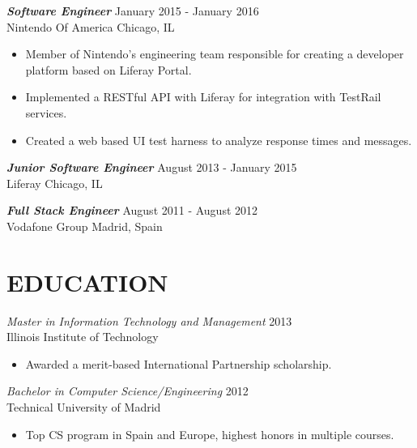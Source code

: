 \documentclass[overlapped, 10pt]{res} %
\begin{document}
\begin{resume}
{\sl \textbf{Software Engineer}} \hfill January 2015 - January 2016 \\
Nintendo Of America \hfill Chicago, IL
\begin{itemize} 
\item Member of Nintendo’s engineering team responsible for creating a developer platform based on Liferay Portal.
\item Implemented a RESTful API with Liferay for integration with TestRail services.
\item Created a web based UI test harness to analyze response times and messages.
\end{itemize} 

{\sl \textbf{Junior Software Engineer}} \hfill August 2013 - January 2015 \\
Liferay \hfill Chicago, IL

{\sl \textbf{Full Stack Engineer}} \hfill August 2011 - August 2012 \\
Vodafone Group \hfill Madrid, Spain

 
\section{EDUCATION}\smallskip

{\sl Master in Information Technology and Management} \hfill 2013 \\
Illinois Institute of Technology
\begin{itemize}
\item Awarded a merit-based International Partnership scholarship.
\end{itemize} 

{\sl Bachelor in Computer Science/Engineering} \hfill 2012 \\
Technical University of Madrid
\begin{itemize} \itemsep -2pt %
\item Top CS program in Spain and Europe, highest honors in multiple courses.
\end{itemize}

\end{resume}
\end{document}
